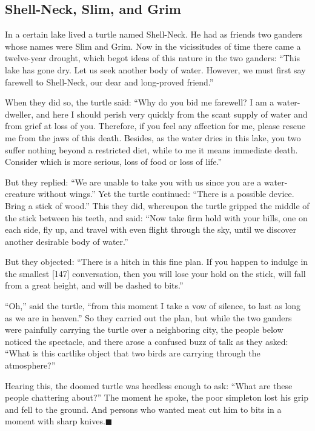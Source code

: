 \documentclass[article, twoside, 14pt]{memoir}
\newcommand{\qed}{\hfill \ensuremath{\blacksquare}}
\begin{document}
\subsection{Shell-Neck, Slim, and Grim}

\label{s19}

In a certain lake lived a turtle named Shell-Neck. He had as
friends two ganders whose names were Slim and Grim. Now in the
vicissitudes of time there came a twelve-year drought, which begot
ideas of this nature in the two ganders:
``This lake has gone dry. Let us seek another body of water. However, we must first say farewell to Shell-Neck, our dear and long-proved friend.''

When they did so, the turtle said:
``Why do you bid me farewell? I am a water-dweller, and here I should perish very quickly from the scant supply of water and from grief at loss of you. Therefore, if you feel any affection for me, please rescue me from the jaws of this death. Besides, as the water dries in this lake, you two suffer nothing beyond a restricted diet, while to me it means immediate death. Consider which is more serious, loss of food or loss of life.''

But they replied:
``We are unable to take you with us since you are a water-creature without wings.''
Yet the turtle continued:
``There is a possible device. Bring a stick of wood.'' This they
did, whereupon the turtle gripped the middle of the stick between
his teeth, and said:
``Now take firm hold with your bills, one on each side, fly up, and travel with even flight through the sky, until we discover another desirable body of water.''

But they objected:
``There is a hitch in this fine plan. If you happen to indulge in the smallest [147] conversation, then you will lose your hold on the stick, will fall from a great height, and will be dashed to bits.''

``Oh,'' said the turtle,
``from this moment I take a vow of silence, to last as long as we are in heaven.''
So they carried out the plan, but while the two ganders were
painfully carrying the turtle over a neighboring city, the people
below noticed the spectacle, and there arose a confused buzz of
talk as they asked:
``What is this cartlike object that two birds are carrying through the atmosphere?''

Hearing this, the doomed turtle was heedless enough to ask:
``What are these people chattering about?'' The moment he spoke,
the poor simpleton lost his grip and fell to the ground. And
persons who wanted meat cut him to bits in a moment with sharp
knives.\hyperref[s19]{\qed}
\end{document}

